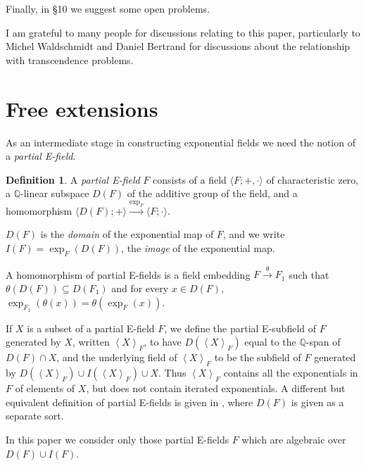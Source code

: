 \documentclass[12pt]{amsart}
\theoremstyle{definition}
\newtheorem{defn}[prop]{Definition}
\begin{document}
Finally, in \S10 we suggest some open problems.

I am grateful to many people for discussions relating to this paper, particularly to Michel Waldschmidt and Daniel Bertrand for discussions about the relationship with transcendence problems. 

\section{Free extensions}

As an intermediate stage in constructing exponential fields we need the notion of a \emph{partial E-field}.
\begin{defn}\label{partial E-field defn}
  A \emph{partial E-field} $F$ consists of a field ${\ensuremath{\langle {F;+,\cdot} \rangle}}$ of characteristic zero, a ${\ensuremath{\mathbb{Q}}}$-linear subspace $D(F)$ of the additive group of the field, and a homomorphism ${\ensuremath{{{\ensuremath{\langle {D(F);+} \rangle}}} \stackrel{{\exp_F}}{\longrightarrow} {{\ensuremath{\langle {F;\cdot} \rangle}}}}}$.

$D(F)$ is the \emph{domain} of the exponential map of $F$, and we write $I(F) = \exp_F(D(F))$, the \emph{image} of the exponential map.

A homomorphism of partial E-fields is a field embedding ${\ensuremath{{F} \stackrel{{\theta}}{\longrightarrow} {F_1}}}$ such that $\theta(D(F)) {\subseteq} D(F_1)$ and for every $x \in D(F)$, $\exp_{F_1}(\theta(x)) = \theta(\exp_F(x))$.
\end{defn}

If $X$ is a subset of a partial E-field $F$, we define the partial E-subfield of $F$ generated by $X$, written ${\ensuremath{\left\langle {X} \right\rangle}}_F$, to have $D({\ensuremath{\left\langle {X} \right\rangle}}_F)$ equal to the ${\ensuremath{\mathbb{Q}}}$-span of $D(F) \cap X$, and the underlying field of ${\ensuremath{\left\langle {X} \right\rangle}}_F$ to be the subfield of $F$ generated by $D({\ensuremath{\left\langle {X} \right\rangle}}_F) \cup I({\ensuremath{\left\langle {X} \right\rangle}}_F) \cup X$. Thus ${\ensuremath{\left\langle {X} \right\rangle}}_F$ contains all the exponentials in $F$ of elements of $X$, but does not contain iterated exponentials. A different but equivalent definition of partial E-fields is given in \cite{EAEF}, where $D(F)$ is given as a separate sort. 

In this paper we consider only those partial E-fields $F$ which are algebraic over $D(F) \cup I(F)$.
\end{document}

